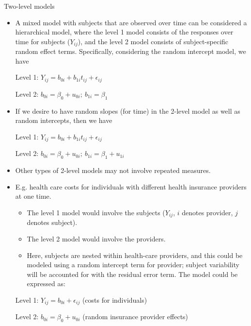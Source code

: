 \documentclass[
  9pt,
  ignorenonframetext,
]{beamer}
\begin{document}
\begin{frame}{Two-level models}
\protect\hypertarget{two-level-models}{}
\begin{itemize}
\item
  A mixed model with subjects that are observed over time can be
  considered a hierarchical model, where the level 1 model consists of
  the responses over time for subjects (\(Y_{ij}\)), and the level 2
  model consists of subject-specific random effect terms. Specifically,
  considering the random intercept model, we have

  Level 1: \(Y_{ij}=b_{0i}+b_{1i} t_{ij}+\epsilon_{ij}\)

  Level 2: \(b_{0i}=\beta_0+u_{0i};\ b_{1i}=\beta_1\)
\item
  If we desire to have random slopes (for time) in the 2-level model as
  well as random intercepts, then we have

  Level 1: \(Y_{ij}=b_{0i}+b_{1i} t_{ij}+\epsilon_{ij}\)

  Level 2: \(b_{0i}=\beta_0+u_{0i}; \ b_{1i}=\beta_1+u_{1i}\)
\end{itemize}
\end{frame}

\begin{frame}{}
\protect\hypertarget{section-2}{}
\begin{itemize}
\item
  Other types of 2-level models may not involve repeated measures.
\item
  E.g. health care costs for individuals with different health insurance
  providers at one time.

  \begin{itemize}
  \item
    The level 1 model would involve the subjects (\(Y_{ij}\), \(i\)
    denotes provider, \(j\) denotes subject).
  \item
    The level 2 model would involve the providers.
  \item
    Here, subjects are nested within health-care providers, and this
    could be modeled using a random intercept term for provider; subject
    variability will be accounted for with the residual error term. The
    model could be expressed as:
  \end{itemize}

  Level 1: \(Y_{ij}=b_{0i}+\epsilon_{ij}\) (costs for individuals)

  Level 2: \(b_{0i}=\beta_0+u_{0i}\) (random insurance provider effects)
\end{itemize}
\end{frame}
\end{document}
